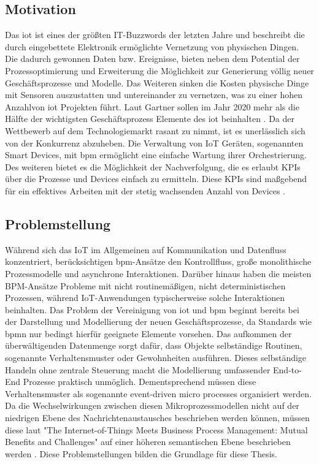 \documentclass[a4paper, 12pt, twoside, headsepline=true]{scrartcl} %
\begin{document}
\subsection{Motivation} \label{motivation}
Das \ac{iot} ist eines der größten IT-Buzzwords der letzten Jahre und beschreibt die durch eingebettete Elektronik ermöglichte Vernetzung von physischen Dingen. Die dadurch gewonnen Daten bzw. Ereignisse, bieten neben dem Potential der Prozessoptimierung und Erweiterung die Möglichkeit zur Generierung völlig neuer Geschäftsprozesse und Modelle. 
Das Weiteren sinken die Kosten physische Dinge mit Sensoren auszustatten und untereinander zu vernetzen, was zu einer hohen Anzahlvon \ac{iot} Projekten führt. Laut Gartner sollen im Jahr 2020 mehr als die Hälfte der wichtigsten Geschäftsprozess Elemente des \ac{iot} beinhalten \cite{garnteriotgrowth}. Da der Wettbewerb auf dem Technologiemarkt rasant zu nimmt, ist es unerlässlich sich von der Konkurrenz abzuheben. Die Verwaltung von IoT Geräten, sogenannten Smart Devices, mit \ac{bpm} ermöglicht eine einfache Wartung ihrer Orchestrierung. Des weiteren bietet es die Möglichkeit der Nachverfolgung, die es erlaubt KPIs über die Prozesse und Devices einfach zu ermitteln. Diese KPIs sind maßgebend für ein effektives Arbeiten mit der stetig wachsenden Anzahl von Devices \cite{bpmofthings}. 

\subsection{Problemstellung} 
Während sich das IoT im Allgemeinen auf Kommunikation und Datenfluss konzentriert, berücksichtigen \ac{bpm}-Ansätze den Kontrollfluss, große monolithische Prozessmodelle und asynchrone Interaktionen. Darüber hinaus haben die meisten BPM-Ansätze Probleme mit nicht routinemäßigen, nicht deterministischen Prozessen, während IoT-Anwendungen typischerweise solche Interaktionen beinhalten. Das Problem der Vereinigung von \ac{iot} und \ac{bpm} beginnt bereits bei der Darstellung und Modellierung der neuen Geschäftsprozesse, da Standards wie \ac{bpmn} nur bedingt hierfür geeignete Elemente vorsehen. Das aufkommen der überwältigenden Datenmenge sorgt dafür, dass Objekte selbständige Routinen, sogenannte Verhaltensmuster oder Gewohnheiten ausführen. Dieses selbständige Handeln ohne zentrale Steuerung macht die Modellierung umfassender End-to-End Prozesse praktisch unmöglich. Dementsprechend müssen diese Verhaltensmuster als sogenannte event-driven micro processes organisiert werden. Da die Wechselwirkungen zwischen diesen Mikroprozessmodellen nicht auf der niedrigen Ebene des Nachrichtenaustausches beschrieben werden können, müssen diese laut "The Internet-of-Things Meets Business Process Management: Mutual Benefits and Challenges" auf einer höheren semantischen Ebene beschrieben werden \cite{iotmeetsbpm}. Diese Problemstellungen bilden die Grundlage für diese Thesis.
\end{document}
